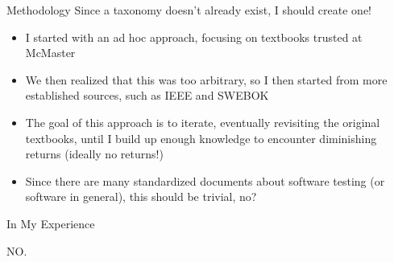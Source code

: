 \documentclass[22pt]{beamer}
\begin{document}
\begin{frame}[fragile]
\begin{textblock}{7.25}
        \begin{block}{\fontsize{37}{20}\selectfont Methodology}
            Since a taxonomy doesn't already exist, I should create one!
            \begin{itemize}
                \item I started with an ad hoc approach, focusing on
                      textbooks trusted at McMaster
                \item We then realized that this was too arbitrary, so
                      I then started from more established sources, such as
                      IEEE and SWEBOK
                \item The goal of this approach is to iterate,
                      eventually revisiting the original textbooks,
                      until I build up enough knowledge to encounter
                      diminishing returns (ideally no returns!)
                \item Since there are many standardized documents about software
                      testing (or software in general), this should be trivial, no?
            \end{itemize}
            \vspace{5mm}
        \end{block}

        \begin{block}{\fontsize{37}{20}\selectfont In My Experience}
            \vspace{5mm}
            \begin{center}
                {\fontsize{185}{20}\selectfont NO.}
            \end{center}
            \vspace{5mm}
        \end{block}
    \end{textblock}


\end{frame}
\end{document}
